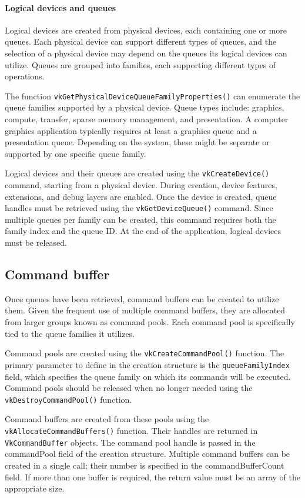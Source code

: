 \paragraph*{Logical devices and queues}
Logical devices are created from physical devices, each containing one or more queues. 
Each physical device can support different types of queues, and the selection of a physical device may depend on the queues its logical devices can utilize.
Queues are grouped into families, each supporting different types of operations.

The function \texttt{vkGetPhysicalDeviceQueueFamilyProperties()} can enumerate the queue families supported by a physical device. 
Queue types include: graphics, compute, transfer, sparse memory management, and presentation.
A computer graphics application typically requires at least a graphics queue and a presentation queue. 
Depending on the system, these might be separate or supported by one specific queue family.

Logical devices and their queues are created using the \texttt{vkCreateDevice()} command, starting from a physical device. 
During creation, device features, extensions, and debug layers are enabled. 
Once the device is created, queue handles must be retrieved using the \texttt{vkGetDeviceQueue()} command. 
Since multiple queues per family can be created, this command requires both the family index and the queue ID.
At the end of the application, logical devices must be released.

\subsection{Command buffer}
Once queues have been retrieved, command buffers can be created to utilize them. 
Given the frequent use of multiple command buffers, they are allocated from larger groups known as command pools. 
Each command pool is specifically tied to the queue families it utilizes.

Command pools are created using the \texttt{vkCreateCommandPool()} function. 
The primary parameter to define in the creation structure is the \texttt{queueFamilyIndex} field, which specifies the queue family on which its commands will be executed. 
Command pools should be released when no longer needed using the \texttt{vkDestroyCommandPool()} function.

Command buffers are created from these pools using the \texttt{vkAllocateCommandBuffers()} function. 
Their handles are returned in \texttt{VkCommandBuffer} objects. 
The command pool handle is passed in the commandPool field of the creation structure. 
Multiple command buffers can be created in a single call; their number is specified in the commandBufferCount field.
If more than one buffer is required, the return value must be an array of the appropriate size.

